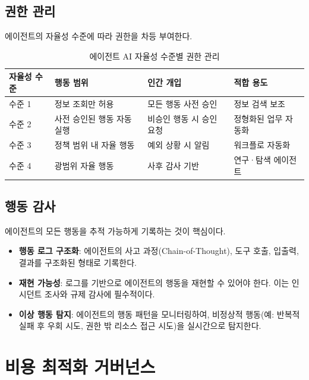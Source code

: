 \subsection{권한 관리}

에이전트의 자율성 수준에 따라 권한을 차등 부여한다.

\begin{table}[htbp]
\centering
\caption{에이전트 AI 자율성 수준별 권한 관리}
\label{tab:agent_autonomy}
\begin{tabularx}{\textwidth}{p{2cm}p{3cm}Xp{3cm}}
\toprule
\textbf{자율성 수준} & \textbf{행동 범위} & \textbf{인간 개입} & \textbf{적합 용도} \\
\midrule
수준 1 & 정보 조회만 허용 & 모든 행동 사전 승인 & 정보 검색 보조 \\
수준 2 & 사전 승인된 행동 자동 실행 & 비승인 행동 시 승인 요청 & 정형화된 업무 자동화 \\
수준 3 & 정책 범위 내 자율 행동 & 예외 상황 시 알림 & 워크플로 자동화 \\
수준 4 & 광범위 자율 행동 & 사후 감사 기반 & 연구·탐색 에이전트 \\
\bottomrule
\end{tabularx}
\end{table}

\subsection{행동 감사}

에이전트의 모든 행동을 추적 가능하게 기록하는 것이 핵심이다.

\begin{itemize}
 \item \textbf{행동 로그 구조화}: 에이전트의 사고 과정(Chain-of-Thought), 도구 호출, 입출력, 결과를 구조화된 형태로 기록한다.
 \item \textbf{재현 가능성}: 로그를 기반으로 에이전트의 행동을 재현할 수 있어야 한다. 이는 인시던트 조사와 규제 감사에 필수적이다.
 \item \textbf{이상 행동 탐지}: 에이전트의 행동 패턴을 모니터링하여, 비정상적 행동(예: 반복적 실패 후 우회 시도, 권한 밖 리소스 접근 시도)을 실시간으로 탐지한다.
\end{itemize}

\section{비용 최적화 거버넌스}
\label{sec:gen.2.7}

